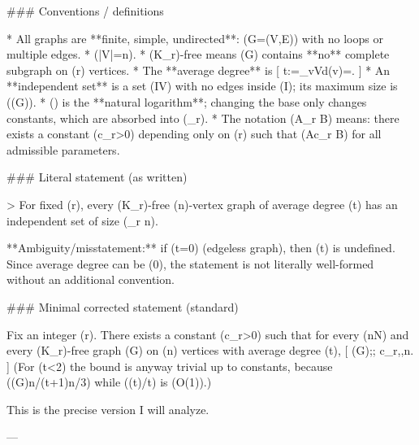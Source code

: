 ### Conventions / definitions

* All graphs are **finite, simple, undirected**: (G=(V,E)) with no loops or multiple edges.
* (|V|=n).
* (K_r)-free means (G) contains **no** complete subgraph on (r) vertices.
* The **average degree** is
  [
  t:=\sum_{v\in V}d(v)=.
  ]
* An **independent set** is a set (I\subseteq V) with no edges inside (I); its maximum size is (\alpha(G)).
* (\log) is the **natural logarithm**; changing the base only changes constants, which are absorbed into (\gg_r).
* The notation (A\gg_r B) means: there exists a constant (c_r>0) depending only on (r) such that (A\ge c_r B) for all admissible parameters.

### Literal statement (as written)

> For fixed (r), every (K_r)-free (n)-vertex graph of average degree (t) has an independent set of size (\gg_r n).

**Ambiguity/misstatement:** if (t=0) (edgeless graph), then (\log t) is undefined. Since average degree can be (0), the statement is not literally well-formed without an additional convention.

### Minimal corrected statement (standard)

Fix an integer (r).
There exists a constant (c_r>0) such that for every (n\in\mathbb N) and every (K_r)-free graph (G) on (n) vertices with average degree (t),
[
\alpha(G);\ge; c_r,,n.
]
(For (t<2) the bound is anyway trivial up to constants, because (\alpha(G)\ge n/(t+1)\ge n/3) while ((\log t)/t) is (O(1)).)

This is the precise version I will analyze.

---
